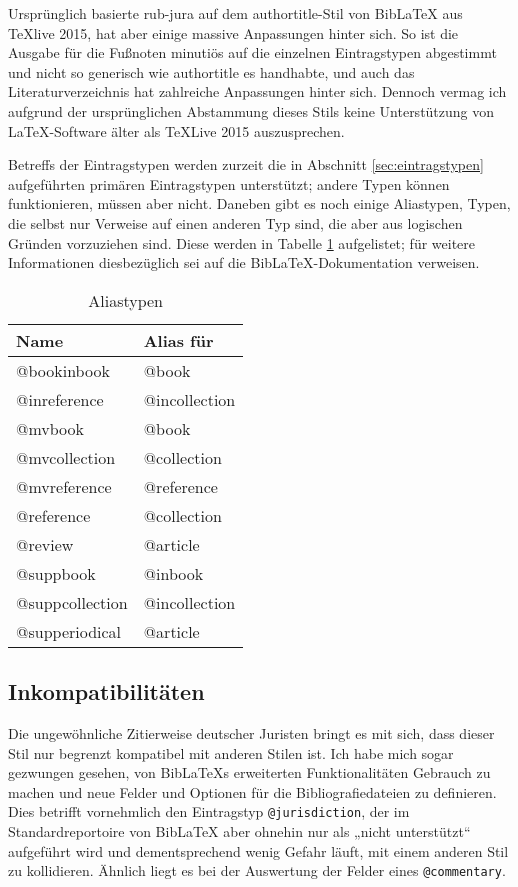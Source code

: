 \documentclass[11pt,a4paper,DIV=calc,draft]{scrartcl}
\newcommand\software[1]{\textsf{#1}}
\newcommand\Biblatex{\software{Bib\LaTeX{}}\xspace}
\begin{document}
Ursprünglich basierte \software{rub-jura} auf dem
\software{authortitle}-Stil von \Biblatex aus \TeX{}live 2015, hat
aber einige massive Anpassungen hinter sich. So ist die Ausgabe für
die Fußnoten minutiös auf die einzelnen Eintragstypen abgestimmt und
nicht so generisch wie \software{authortitle} es handhabte, und auch
das Literaturverzeichnis hat zahlreiche Anpassungen hinter
sich. Dennoch vermag ich aufgrund der ursprünglichen Abstammung dieses
Stils keine Unterstützung von \LaTeX-Software älter als \TeX{}Live
2015 auszusprechen.

Betreffs der Eintragstypen werden zurzeit die in Abschnitt
\ref{sec:eintragstypen} aufgeführten primären Eintragstypen
unterstützt; andere Typen können funktionieren, müssen aber
nicht. Daneben gibt es noch einige Aliastypen, \dh Typen, die selbst
nur Verweise auf einen anderen Typ sind, die aber aus logischen
Gründen vorzuziehen sind. Diese werden in Tabelle \ref{tab:aliastypen}
aufgelistet; für weitere Informationen diesbezüglich sei auf die
\Biblatex-Do\-ku\-men\-ta\-tion verweisen.

\begin{table}
  \centering
  \begin{tabular}{ll}
    \textbf{Name} & \textbf{Alias für}\\
    \hline
    @bookinbook     & @book\\
    @inreference    & @incollection\\
    @mvbook         & @book\\
    @mvcollection   & @collection\\
    @mvreference    & @reference\\
    @reference      & @collection\\
    @review         & @article\\
    @suppbook       & @inbook\\
    @suppcollection & @incollection\\
    @supperiodical  & @article
  \end{tabular}
  \caption{Aliastypen}
  \label{tab:aliastypen}
\end{table}

\subsection{Inkompatibilitäten}\label{sec:inkompat}

Die ungewöhnliche Zitierweise deutscher Juristen bringt es mit sich,
dass dieser Stil nur begrenzt kompatibel mit anderen Stilen ist. Ich
habe mich sogar gezwungen gesehen, von \Biblatex{}s erweiterten
Funktionalitäten Gebrauch zu machen und neue Felder und Optionen für
die Bibliografiedateien zu definieren. Dies betrifft vornehmlich den
Eintragstyp \verb+@jurisdiction+, der im Standardreportoire von
\Biblatex aber ohnehin nur als „nicht unterstützt“ aufgeführt wird und
dementsprechend wenig Gefahr läuft, mit einem anderen Stil zu
kollidieren. Ähnlich liegt es bei der Auswertung der Felder eines
\verb+@commentary+.
\end{document}
